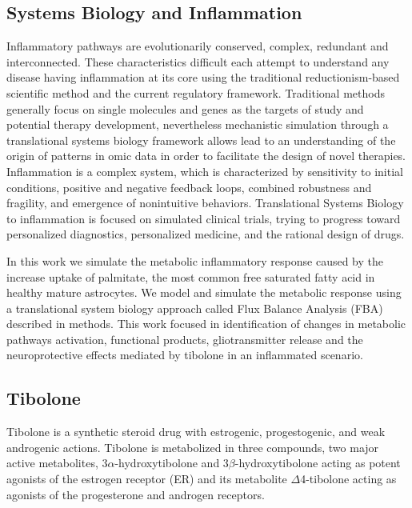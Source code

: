 \subsection*{Systems Biology and  Inflammation}
Inflammatory pathways are evolutionarily conserved, complex, redundant and interconnected. These characteristics difficult each attempt to understand any disease having inflammation at its core using the traditional reductionism-based scientific method and the current regulatory framework. Traditional methods generally focus on single molecules and genes as the targets of study and potential therapy development, nevertheless mechanistic simulation through a translational systems biology framework allows lead to an understanding of the origin of patterns in omic data in order to facilitate the design of novel therapies. Inflammation is a complex system, which is characterized by sensitivity to initial conditions, positive and negative feedback loops, combined robustness and fragility, and emergence of nonintuitive behaviors. Translational Systems Biology to inflammation is focused on simulated clinical trials, trying to progress toward personalized diagnostics, personalized medicine, and the rational design of drugs.

In this work we simulate the metabolic inflammatory response caused by the increase uptake of palmitate,  the most common free saturated fatty acid in healthy mature astrocytes. We model and simulate the metabolic response using a translational system biology approach called Flux Balance Analysis (FBA) described in methods. This work focused in identification of changes in metabolic pathways activation, functional products, gliotransmitter release and the neuroprotective effects mediated by tibolone in an inflammated scenario.


\subsection*{Tibolone}
Tibolone is a synthetic steroid drug with estrogenic, progestogenic, and weak androgenic actions. Tibolone is metabolized in three compounds, two major active metabolites, 3$\alpha$-hydroxytibolone and 3$\beta$-hydroxytibolone acting as potent agonists of the estrogen receptor (ER) and its metabolite $\Delta$4-tibolone acting as agonists of the progesterone and androgen receptors.


